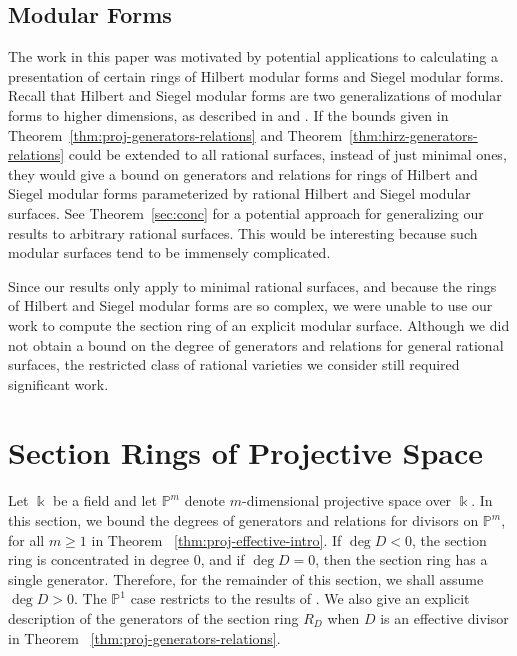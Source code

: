 \documentclass{amsart}
\theoremstyle{plain}
\theoremstyle{definition}
\theoremstyle{remark}
\numberwithin{equation}{section}
\newcommand\bp{{\mathbb P}}
\newcommand\bk{{\Bbbk}}
\begin{document}
\subsection{Modular Forms}
\label{subsection:modular-forms}
The work in this paper was motivated by 
potential applications to
calculating a presentation of certain rings of
Hilbert 
modular forms and Siegel modular forms. 
Recall that Hilbert and Siegel 
modular forms are two generalizations of modular forms to higher dimensions,
as described in \cite{geer:siegel-modular} and \cite{bruinier:hilbert-modular}.
If the bounds given in 
Theorem~\ref{thm:proj-generators-relations} and Theorem~\ref{thm:hirz-generators-relations}
could be extended to all rational surfaces, instead of just minimal ones,
they would give a bound on generators and relations for 
rings of Hilbert and Siegel modular forms parameterized by rational
Hilbert and Siegel modular surfaces.
See Theorem~\ref{sec:conc} for a potential approach for generalizing our results to arbitrary rational surfaces.
This would be interesting because such modular surfaces tend to be
immensely complicated. 

Since our results only apply to minimal rational surfaces, and because the rings of Hilbert and Siegel modular forms are so complex, we were unable
to use our work to compute the section ring of an explicit modular surface.
Although we did not obtain a bound on the degree of generators and relations
for general rational surfaces, the restricted class of rational varieties we consider still required significant work.


\section{Section Rings of Projective Space}
\label{sec:proj}
Let $\bk$ be a field and let $\bp^m$ denote $m$-dimensional
projective space over $\bk$. In this section, we bound the degrees
of generators and relations for divisors
on $\bp^m$, for all $m \geq 1$ in Theorem
~\ref{thm:proj-effective-intro}.
If $\deg D < 0$, the
section ring is concentrated in degree 0, and if
$\deg D = 0$, then the section ring has a single
generator. Therefore, for the remainder of this section,
we shall assume $\deg D > 0$.
The $\bp^1$ case restricts to the results of
\cite{dorney:canonical}. We also give an explicit description of the
generators of the section ring $R_D$ when $D$ is an effective divisor in Theorem ~\ref{thm:proj-generators-relations}.
\end{document}
